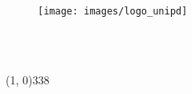 \begin{titlepage}
\begin{center}

\begin{LARGE}
\textbf{\university}\\
\end{LARGE}

\vspace{10pt}

\begin{Large}
\textsc{\dept}\\
\end{Large}

\vspace{10pt}

\begin{large}
\textsc{\faculty}\\
\end{large}

\vspace{30pt}
\begin{figure}[htbp]
\begin{center}
\texttt{[image: images/logo\_unipd]}
\end{center}
\end{figure}
\vspace{30pt} 

\begin{LARGE}
\begin{center}
\textbf{\title}\\
\end{center}
\end{LARGE}

\begin{Large}
	\begin{center}
		\textbf{\subtitle}\\
	\end{center}
\end{Large}

\vspace{20pt} 

\begin{large}
\begin{flushright}
\textit{\fstauthor \\ \sndauthor \\ \trdauthor}
\end{flushright}
\end{large}

\vspace{40pt}

\line(1, 0){338} \\
\begin{normalsize}
\textsc{\myyear}
\end{normalsize}

\end{center}
\end{titlepage} 